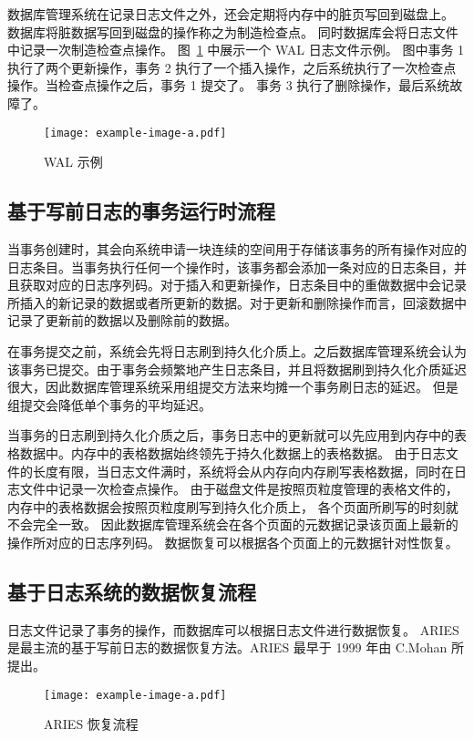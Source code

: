 数据库管理系统在记录日志文件之外，还会定期将内存中的脏页写回到磁盘上。
数据库将脏数据写回到磁盘的操作称之为制造检查点。
同时数据库会将日志文件中记录一次制造检查点操作。
图~\ref{fig:wal} 中展示一个 WAL 日志文件示例。 图中事务 1 执行了两个更新操作，事务 2 执行了一个插入操作，之后系统执行了一次检查点操作。当检查点操作之后，事务 1 提交了。
事务 3 执行了删除操作，最后系统故障了。


\begin{figure}
    \centering
    \texttt{[image: example-image-a.pdf]}
    \caption{WAL 示例}
    \label{fig:wal}
\end{figure}

\subsection{基于写前日志的事务运行时流程}

当事务创建时，其会向系统申请一块连续的空间用于存储该事务的所有操作对应的日志条目。当事务执行任何一个操作时，该事务都会添加一条对应的日志条目，并且获取对应的日志序列码。对于插入和更新操作，日志条目中的重做数据中会记录所插入的新记录的数据或者所更新的数据。对于更新和删除操作而言，回滚数据中记录了更新前的数据以及删除前的数据。

在事务提交之前，系统会先将日志刷到持久化介质上。之后数据库管理系统会认为该事务已提交。由于事务会频繁地产生日志条目，并且将数据刷到持久化介质延迟很大，因此数据库管理系统采用组提交方法来均摊一个事务刷日志的延迟。
但是组提交会降低单个事务的平均延迟。

当事务的日志刷到持久化介质之后，事务日志中的更新就可以先应用到内存中的表格数据中。内存中的表格数据始终领先于持久化数据上的表格数据。
由于日志文件的长度有限，当日志文件满时，系统将会从内存向内存刷写表格数据，同时在日志文件中记录一次检查点操作。
由于磁盘文件是按照页粒度管理的表格文件的，内存中的表格数据会按照页粒度刷写到持久化介质上，
各个页面所刷写的时刻就不会完全一致。
因此数据库管理系统会在各个页面的元数据记录该页面上最新的操作所对应的日志序列码。
数据恢复可以根据各个页面上的元数据针对性恢复。


\subsection{基于日志系统的数据恢复流程}

日志文件记录了事务的操作，而数据库可以根据日志文件进行数据恢复。
ARIES 是最主流的基于写前日志的数据恢复方法。ARIES 最早于 1999 年由 C.Mohan 所提出\cite{mohan_aries_1992}。

\begin{figure}
    \centering
    \texttt{[image: example-image-a.pdf]}
    \caption{ARIES 恢复流程}
    \label{fig:ARIES}
\end{figure}


